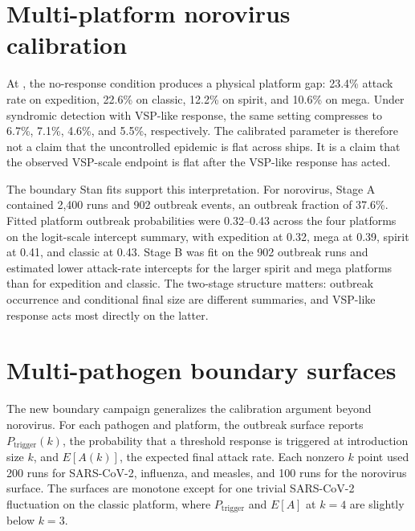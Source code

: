 \section{Multi-platform norovirus calibration}
At , the no-response condition produces a physical platform gap: 23.4\% attack rate on expedition,
22.6\% on classic, 12.2\% on spirit, and 10.6\% on mega. Under syndromic detection with VSP-like response, the same
setting compresses to 6.7\%, 7.1\%, 4.6\%, and 5.5\%, respectively. The calibrated parameter is therefore not a
claim that the uncontrolled epidemic is flat across ships. It is a claim that the observed VSP-scale endpoint is
flat after the VSP-like response has acted.

The boundary Stan fits support this interpretation. For norovirus, Stage A contained 2,400 runs and 902 outbreak
events, an outbreak fraction of 37.6\%. Fitted platform outbreak probabilities were 0.32--0.43 across the four
platforms on the logit-scale intercept summary, with expedition at 0.32, mega at 0.39, spirit at 0.41, and classic
at 0.43. Stage B was fit on the 902 outbreak runs and estimated lower attack-rate intercepts for the larger spirit
and mega platforms than for expedition and classic. The two-stage structure matters: outbreak occurrence and
conditional final size are different summaries, and VSP-like response acts most directly on the latter.

\section{Multi-pathogen boundary surfaces}
The new boundary campaign generalizes the calibration argument beyond norovirus. For each pathogen and platform,
the outbreak surface reports \(P_{\mathrm{trigger}}(k)\), the probability that a threshold response is triggered at
introduction size \(k\), and \(E[A(k)]\), the expected final attack rate. Each nonzero \(k\) point used 200 runs
for SARS-CoV-2, influenza, and measles, and 100 runs for the norovirus surface. The surfaces are monotone except
for one trivial SARS-CoV-2 fluctuation on the classic platform, where
\(P_{\mathrm{trigger}}\) and \(E[A]\) at \(k=4\) are slightly below \(k=3\).

